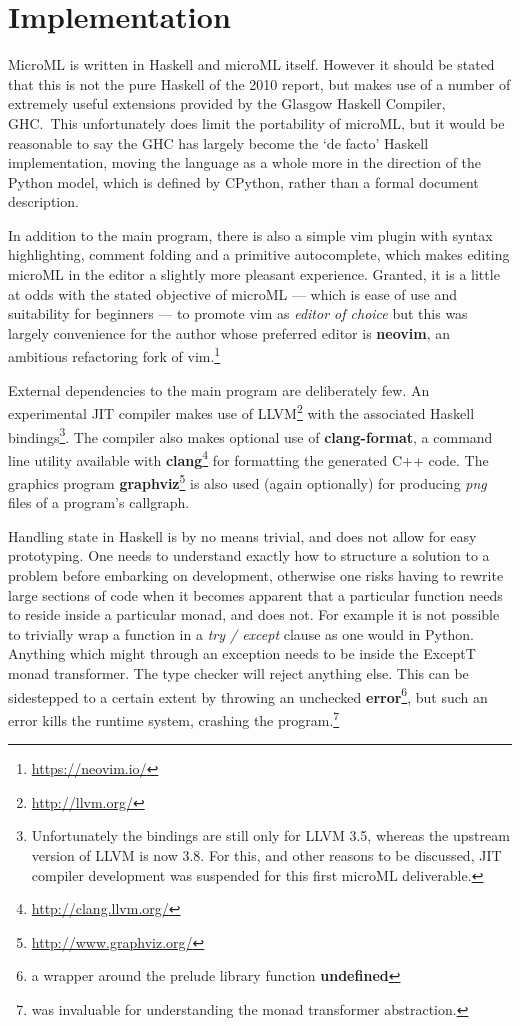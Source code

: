 \documentclass[12pt, a4paper]{report}
\begin{document}
\section{Implementation}
MicroML is written in Haskell and microML itself. However it should be stated that this is not the
pure Haskell of the 2010 report\cite{Marlow_haskell2010}, but makes use of a number of extremely
useful extensions provided by the Glasgow Haskell Compiler, GHC.\ This unfortunately does limit the
portability of microML, but it would be reasonable to say the GHC has largely become the `de facto'
Haskell implementation, moving the language as a whole more in the direction of the Python model,
which is defined by CPython, rather than a formal document description.

In addition to the main program, there is also a simple vim plugin with syntax highlighting,
comment folding and a primitive autocomplete, which makes editing microML in the editor a slightly
more pleasant experience. Granted, it is a little at odds with the stated objective of microML ---
which is ease of use and suitability for beginners --- to promote vim as \textit{editor of choice} but
this was largely convenience for the author whose preferred editor is \textbf{neovim}, an ambitious
refactoring fork of vim.\footnote{\url{https://neovim.io/}}

External dependencies to the main program are deliberately few. An experimental JIT
compiler makes use of LLVM\footnote{\url{http://llvm.org/}} with the associated Haskell
bindings\footnote{Unfortunately the bindings are still only for LLVM 3.5, whereas the
upstream version of LLVM is now 3.8. For this, and other reasons to be discussed, JIT
compiler development was suspended for this first microML deliverable.}. The compiler
also makes optional use of \textbf{clang-format}, a command line utility available with
\textbf{clang}\footnote{\url{http://clang.llvm.org/}} for formatting the generated C++ code. The
graphics program \textbf{graphviz}\footnote{\url{http://www.graphviz.org/}} is also used (again
optionally) for producing \textit{png} files of a program's callgraph.

Handling state in Haskell is by no means trivial, and does not allow for easy prototyping. One needs
to understand exactly how to structure a solution to a problem before embarking on development,
otherwise one risks having to rewrite large sections of code when it becomes apparent that a
particular function needs to reside inside a particular monad, and does not. For example it is not
possible to trivially wrap a function in a \textit{try / except} clause as one would in Python.
Anything which might through an exception needs to be inside the ExceptT monad transformer. The type
checker will reject anything else. This can be sidestepped to a certain extent by throwing an
unchecked \textbf{error}\footnote{a wrapper around the prelude library function \textbf{undefined}},
but such an error kills the runtime system, crashing the program.\footnote{\cite{transformers} was
invaluable for understanding the monad transformer abstraction.}
\end{document}

